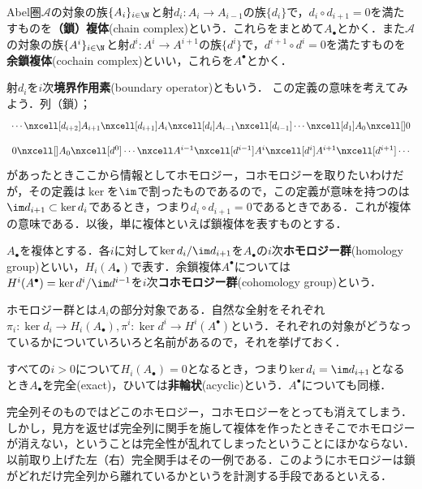 \begin{defi}[複体]
	Abel圏$\mathscr{A}$の対象の族$\{A_i\}_{i\in\N}$と射$d_i:A_{i}\to A_{i-1}$の族$\{d_i\}$で，$d_{i}\circ d_{i+1}=0$を満たすものを\textbf{（鎖）複体}(chain complex)という．これらをまとめて$A_\bullet$とかく．また$\mathscr{A}$の対象の族$\{A^i\}_{i\in\N}$と射$d^i:A^i\to A^{i+1}$の族$\{d^i\}$で，$d^{i+1}\circ d^{i}=0$を満たすものを\textbf{余鎖複体}(cochain complex)といい，これらを$A^\bullet$とかく．
\end{defi}

射$d_i$を$i$次\textbf{境界作用素}(boundary operator)ともいう． この定義の意味を考えてみよう．列（鎖）；
\[\begin{tikzcd}
\cdots\nxcell[d_{i+2}]A_{i+1}\nxcell[d_{i+1}]A_i\nxcell[d_i]A_{i-1}\nxcell[d_{i-1}]\cdots\nxcell[d_1] A_0\nxcell[]0
\end{tikzcd}\]
\[\begin{tikzcd}
0\nxcell[]A_0\nxcell[d^0]\cdots\nxcell A^{i-1}\nxcell[d^{i-1}]A^i\nxcell[d^i]A^{i+1}\nxcell[d^{i+1}]\cdots
\end{tikzcd}\]
があったときここから情報としてホモロジー，コホモロジーを取りたいわけだが，その定義は$\ker$を$\im$で割ったものであるので，この定義が意味を持つのは$\im d_{i+1}\subset\ker d_i$であるとき，つまり$d_i\circ d_{i+1}=0$であるときである．これが複体の意味である．以後，単に複体といえば鎖複体を表すものとする．
\begin{defi}
	$A_\bullet$を複体とする．各$i$に対して$\ker d_i/\im d_{i+1}$を$A_\bullet$の$i$次\textbf{ホモロジー群}(homology group)といい，$H_i(A_\bullet)$で表す．余鎖複体$A^\bullet$については $H^i(A^\bullet)=\ker d^i/\im d^{i-1}$を$i$次\textbf{コホモロジー群}(cohomology group)という．
\end{defi}

ホモロジー群とは$A_i$の部分対象である．自然な全射をそれぞれ$\pi_i:\ker d_i\to H_i(A_\bullet),\pi^i:\ker d^i\to H^i(A^\bullet)$という．それぞれの対象がどうなっているかについていろいろと名前があるので，それを挙げておく．
\begin{defi}[非輪状]
	すべての$i>0$について$H_i(A_\bullet)=0$となるとき，つまり$\ker d_i=\im d_{i+1}$となるとき$A_\bullet$を完全(exact)，ひいては\textbf{非輪状}(acyclic)という．$A^\bullet$についても同様．
\end{defi}

完全列そのものではどこのホモロジー，コホモロジーをとっても消えてしまう．しかし，見方を返せば完全列に関手を施して複体を作ったときそこでホモロジーが消えない，ということは完全性が乱れてしまったということにほかならない．以前取り上げた左（右）完全関手はその一例である．このようにホモロジーは鎖がどれだけ完全列から離れているかというを計測する手段であるといえる．

